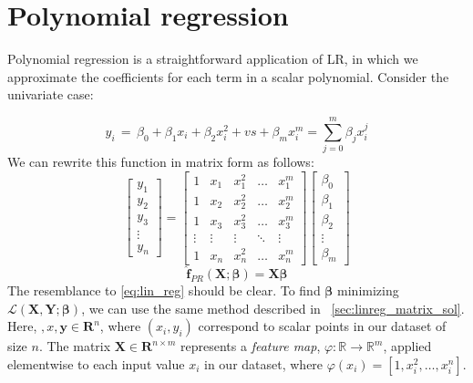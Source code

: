 \section{Polynomial regression}\label{sec:poly_reg}

Polynomial regression is a straightforward application of LR, in which we approximate the coefficients for each term in a scalar polynomial. Consider the univariate case:

\begin{equation}
y_i \,=\, \beta_0 + \beta_1 x_i + \beta_2 x_i^2 + vs + \beta_m x_i^m = \sum_{j=0}^{m} \beta_j x_i^{j}
\end{equation}
%
We can rewrite this function in matrix form as follows:
%
\begin{equation}
\begin{bmatrix} y_1\\ y_2\\ y_3 \\ \vdots \\ y_n \end{bmatrix}= \begin{bmatrix} 1 & x_1 & x_1^2 & \dots & x_1^m \\ 1 & x_2 & x_2^2 & \dots & x_2^m \\ 1 & x_3 & x_3^2 & \dots & x_3^m \\ \vdots & \vdots & \vdots & \ddots & \vdots \\ 1 & x_n & x_n^2 & \dots & x_n^m \end{bmatrix} \begin{bmatrix} \beta_0\\ \beta_1\\ \beta_2\\ \vdots \\ \beta_m \end{bmatrix}
\end{equation}
%
\begin{equation}
\mathbf{\hat f}_{PR}(\mathbf{X}; \bm\beta) = \mathbf{X}\bm\beta
\end{equation}
%
The resemblance to \autoref{eq:lin_reg} should be clear. To find $\bm\beta$ minimizing $\mathcal L(\mathbf{X}, \mathbf{Y};\bm\beta)$, we can use the same method described in ~\autoref{sec:linreg_matrix_sol}. Here, $\mathbf, x, \mathbf y \in \mathbf R^n$, where $(x_i, y_i)$ correspond to scalar points in our dataset of size $n$. The matrix $\mathbf X \in \mathbf R^{n\times m}$ represents a \textit{feature map}, $\varphi: \mathbb R \rightarrow \mathbb R^m$, applied elementwise to each input value $x_i$ in our dataset, where $\varphi(x_i) = \left[1, x_i^2, \ldots, x_i^n\right]$.
